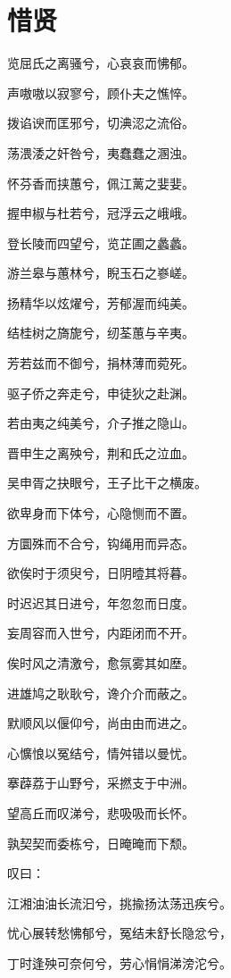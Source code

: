 \documentclass[UTF8,titlepage,oneside]{ctexbook}
\begin{document}
\section*{惜贤}
\begin{center}
	
	览屈氏之离骚兮，心哀哀而怫郁。
	
	声嗷嗷以寂寥兮，顾仆夫之憔悴。
	
	拨谄谀而匡邪兮，切淟涊之流俗。
	
	荡渨涹之奸咎兮，夷蠢蠢之溷浊。
	
	怀芬香而挟蕙兮，佩江蓠之婓婓。
	
	握申椒与杜若兮，冠浮云之峨峨。
	
	登长陵而四望兮，览芷圃之蠡蠡。
	
	游兰皋与蕙林兮，睨玉石之嵾嵯。
	
	扬精华以炫燿兮，芳郁渥而纯美。
	
	结桂树之旖旎兮，纫荃蕙与辛夷。
	
	芳若兹而不御兮，捐林薄而菀死。
	
	驱子侨之奔走兮，申徒狄之赴渊。
	
	若由夷之纯美兮，介子推之隐山。
	
	晋申生之离殃兮，荆和氏之泣血。
	
	吴申胥之抉眼兮，王子比干之横废。
	
	欲卑身而下体兮，心隐恻而不置。
	
	方圜殊而不合兮，钩绳用而异态。
	
	欲俟时于须臾兮，日阴曀其将暮。
	
	时迟迟其日进兮，年忽忽而日度。
	
	妄周容而入世兮，内距闭而不开。
	
	俟时风之清激兮，愈氛雾其如塺。
	
	进雄鸠之耿耿兮，谗介介而蔽之。
	
	默顺风以偃仰兮，尚由由而进之。
	
	心懭悢以冤结兮，情舛错以曼忧。
	
	搴薜荔于山野兮，采撚支于中洲。
	
	望高丘而叹涕兮，悲吸吸而长怀。
	
	孰契契而委栋兮，日晻晻而下颓。
	
	叹曰：
	
	江湘油油长流汩兮，挑揄扬汰荡迅疾兮。
	
	忧心展转愁怫郁兮，冤结未舒长隐忿兮，
	
	丁时逢殃可奈何兮，劳心悁悁涕滂沱兮。
	
	
\end{center}
\end{document}
